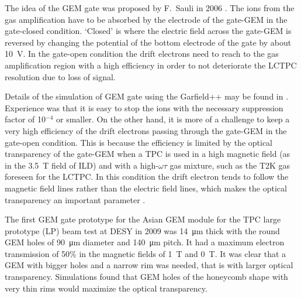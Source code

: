 The idea of the GEM gate was proposed by F.~Sauli in 2006 \cite{Sauli2006269}.
The ions from the gas amplification have to be absorbed by the electrode of the gate-GEM in the gate-closed condition.
`Closed' is where the electric field across the gate-GEM is reversed by changing the potential of the bottom
electrode of the gate by about \SI{10}{V}. In the gate-open condition the drift electrons need to reach
to the gas amplification region with a high efficiency in order to not deteriorate the LCTPC resolution
due to loss of signal.

Details of the simulation of GEM gate using the Garfield++ may be found in \cite{LC-DET-2012-079}. Experience was that it is easy
to stop the ions with the necessary suppression factor of 10$^{-4}$ or smaller. On the other hand, it is more
of a challenge to keep a very high efficiency of the drift electrons passing through the gate-GEM in the gate-open
condition. This is because the efficiency is limited by the optical transparency of the gate-GEM when a TPC
is used in a high magnetic field (as in the \SI{3.5}{T} field of ILD) and with a high-$\omega\tau$ gas mixture,
such as the T2K gas \cite{Behnke:2013lya,ref4T2Kgas_ishikawa,Kobayashi201137,Kobayashi2013122} foreseen for the LCTPC. In this condition the drift electron tends to follow the
magnetic field lines rather than the electric field lines, which makes the optical transparency an important parameter .

The first GEM gate prototype for the Asian GEM module for the TPC large prototype (LP) beam test at
DESY in 2009 was \SI{14}{\micro m} thick with the round GEM holes of
\SI{90}{\micro m} diameter and \SI{140}{\micro m} pitch. It had a maximum electron
transmission of 50\% in the magnetic fields of \SI{1}{T} and \SI{0}{T}. It was clear that a GEM
with bigger holes and a narrow rim was needed, that is with larger optical transparency. Simulations found that
GEM holes of the honeycomb shape with very thin rims would maximize the optical transparency.

